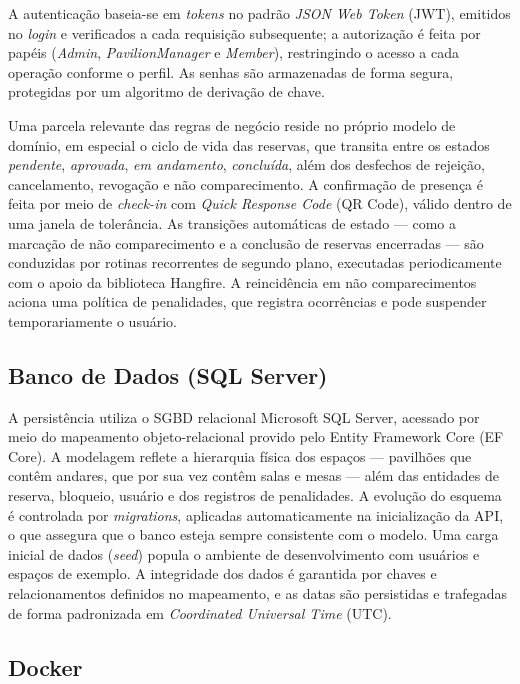 A autenticação baseia-se em \textit{tokens} no padrão \textit{JSON Web Token} (JWT), emitidos no \textit{login} e verificados a cada requisição subsequente; a autorização é feita por papéis (\textit{Admin}, \textit{PavilionManager} e \textit{Member}), restringindo o acesso a cada operação conforme o perfil. As senhas são armazenadas de forma segura, protegidas por um algoritmo de derivação de chave.

Uma parcela relevante das regras de negócio reside no próprio modelo de domínio, em especial o ciclo de vida das reservas, que transita entre os estados \textit{pendente}, \textit{aprovada}, \textit{em andamento}, \textit{concluída}, além dos desfechos de rejeição, cancelamento, revogação e não comparecimento. A confirmação de presença é feita por meio de \textit{check-in} com \textit{Quick Response Code} (QR Code), válido dentro de uma janela de tolerância. As transições automáticas de estado — como a marcação de não comparecimento e a conclusão de reservas encerradas — são conduzidas por rotinas recorrentes de segundo plano, executadas periodicamente com o apoio da biblioteca Hangfire. A reincidência em não comparecimentos aciona uma política de penalidades, que registra ocorrências e pode suspender temporariamente o usuário.

\subsection{Banco de Dados (SQL Server)}\label{subsec:sqlserver}

A persistência utiliza o SGBD relacional Microsoft SQL Server, acessado por meio do mapeamento objeto-relacional provido pelo Entity Framework Core (EF Core). A modelagem reflete a hierarquia física dos espaços — pavilhões que contêm andares, que por sua vez contêm salas e mesas — além das entidades de reserva, bloqueio, usuário e dos registros de penalidades. A evolução do esquema é controlada por \textit{migrations}, aplicadas automaticamente na inicialização da API, o que assegura que o banco esteja sempre consistente com o modelo. Uma carga inicial de dados (\textit{seed}) popula o ambiente de desenvolvimento com usuários e espaços de exemplo. A integridade dos dados é garantida por chaves e relacionamentos definidos no mapeamento, e as datas são persistidas e trafegadas de forma padronizada em \textit{Coordinated Universal Time} (UTC).

\subsection{Docker}\label{subsec:docker}

